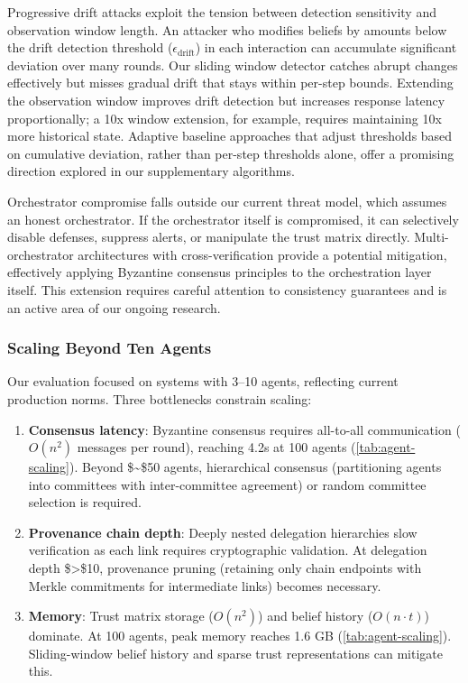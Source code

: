 \documentclass[
]{article}
\begin{document}
Progressive drift attacks exploit the tension between detection
sensitivity and observation window length. An attacker who modifies
beliefs by amounts below the drift detection threshold
(\(\epsilon_{\text{drift}}\)) in each interaction can accumulate
significant deviation over many rounds. Our sliding window detector
catches abrupt changes effectively but misses gradual drift that stays
within per-step bounds. Extending the observation window improves drift
detection but increases response latency proportionally; a 10x window
extension, for example, requires maintaining 10x more historical state.
Adaptive baseline approaches that adjust thresholds based on cumulative
deviation, rather than per-step thresholds alone, offer a promising
direction explored in our supplementary algorithms.

Orchestrator compromise falls outside our current threat model, which
assumes an honest orchestrator. If the orchestrator itself is
compromised, it can selectively disable defenses, suppress alerts, or
manipulate the trust matrix directly. Multi-orchestrator architectures
with cross-verification provide a potential mitigation, effectively
applying Byzantine consensus principles to the orchestration layer
itself. This extension requires careful attention to consistency
guarantees and is an active area of our ongoing research.

\subsubsection{Scaling Beyond Ten
Agents}\label{scaling-beyond-ten-agents}

Our evaluation focused on systems with 3--10 agents, reflecting current
production norms. Three bottlenecks constrain scaling:

\begin{enumerate}
\def\labelenumi{\arabic{enumi}.}
\item
  \textbf{Consensus latency}: Byzantine consensus requires all-to-all
  communication (\(O(n^2)\) messages per round), reaching 4.2s at 100
  agents (\cref{tab:agent-scaling}). Beyond \$\sim\$50 agents,
  hierarchical consensus (partitioning agents into committees with
  inter-committee agreement) or random committee selection is required.
\item
  \textbf{Provenance chain depth}: Deeply nested delegation hierarchies
  slow verification as each link requires cryptographic validation. At
  delegation depth \$\textgreater\$10, provenance pruning (retaining
  only chain endpoints with Merkle commitments for intermediate links)
  becomes necessary.
\item
  \textbf{Memory}: Trust matrix storage (\(O(n^2)\)) and belief history
  (\(O(n \cdot t)\)) dominate. At 100 agents, peak memory reaches 1.6 GB
  (\cref{tab:agent-scaling}). Sliding-window belief history and sparse
  trust representations can mitigate this.
\end{enumerate}
\end{document}
